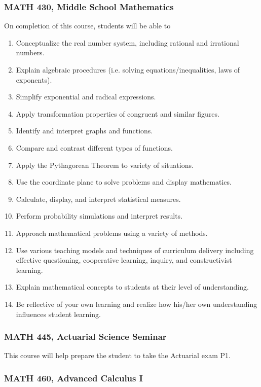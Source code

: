 \documentclass[11pt]{article}
\newenvironment{alphalist}{
\begin{enumerate}[label=(\arabic*),widest=107 ,leftmargin=25pt, itemsep=0pt]}
{\end{enumerate}}
\begin{document}
\subsubsection{MATH 430,  Middle School Mathematics}

On completion of this course, students will be able to 
\begin{alphalist}
\item Conceptualize the real number system, including rational and irrational numbers. 
\item Explain algebraic procedures (i.e. solving equations/inequalities, laws of exponents). 
\item Simplify exponential and radical expressions. 
\item Apply transformation properties of congruent and similar figures. 
\item Identify and interpret graphs and functions. 
\item Compare and contrast different types of functions. 
\item Apply the Pythagorean Theorem to variety of situations. 
\item Use the coordinate plane to solve problems and display mathematics. 
\item Calculate, display, and interpret statistical measures. 
\item Perform probability simulations and interpret results. 
\item Approach mathematical problems using a variety of methods. 
\item Use various teaching models and techniques of curriculum delivery including effective questioning, cooperative learning, inquiry, and constructivist learning. 
\item Explain mathematical concepts to students at their level of understanding. 
\item Be reflective of your own learning and realize how his/her own understanding influences student learning.
\end{alphalist}

\subsubsection{MATH 445, Actuarial Science Seminar}

This course will help prepare the student to take the Actuarial exam P1.

\subsubsection{MATH 460, Advanced Calculus I}
\end{document}
